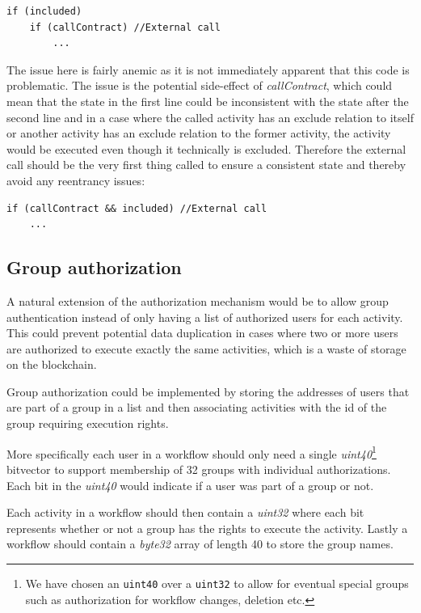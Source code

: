 \documentclass{article}
\begin{document}
			\begin{lstlisting}[language=pseudocode]
if (included)
	if (callContract) //External call
		...
			\end{lstlisting}

			The issue here is fairly anemic as it is not immediately apparent that this code is problematic.
			The issue is the potential side-effect of \emph{callContract}, which could mean that the state in the first line could be inconsistent with the state after the second line and in a case where the called activity has an exclude relation to itself or another activity has an exclude relation to the former activity, the activity would be executed even though it technically is excluded.
			Therefore the external call should be the very first thing called to ensure a consistent state and thereby avoid any reentrancy issues:

			\begin{lstlisting}[language=pseudocode]
if (callContract && included) //External call
	...
			\end{lstlisting}

		\subsection{Group authorization}
		A natural extension of the authorization mechanism would be to allow group authentication instead of only having a list of authorized users for each activity.
		This could prevent potential data duplication in cases where two or more users are authorized to execute exactly the same activities, which is a waste of storage on the blockchain.

		Group authorization could be implemented by storing the addresses of users that are part of a group in a list and then associating activities with the id of the group requiring execution rights.

		More specifically each user in a workflow should only need a single \emph{uint40}\footnote{We have chosen an \texttt{uint40} over a \texttt{uint32} to allow for eventual special groups such as authorization for workflow changes, deletion etc.} bitvector to support membership of 32 groups with individual authorizations. Each bit in the \emph{uint40} would indicate if a user was part of a group or not.

		Each activity in a workflow should then contain a \emph{uint32} where each bit represents whether or not a group has the rights to execute the activity.
		Lastly a workflow should contain a \emph{byte32} array of length 40 to store the group names.
\end{document}

